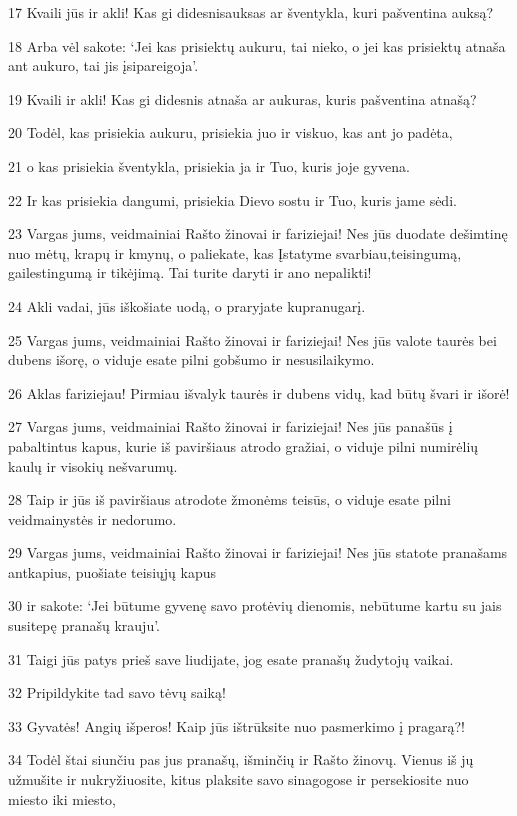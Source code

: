 \par 17 Kvaili jūs ir akli! Kas gi didesnis­auksas ar šventykla, kuri pašventina auksą? 
\par 18 Arba vėl sakote: ‘Jei kas prisiektų aukuru, tai nieko, o jei kas prisiektų atnaša ant aukuro, tai jis įsipareigoja’. 
\par 19 Kvaili ir akli! Kas gi didesnis­ atnaša ar aukuras, kuris pašventina atnašą? 
\par 20 Todėl, kas prisiekia aukuru, prisiekia juo ir viskuo, kas ant jo padėta, 
\par 21 o kas prisiekia šventykla, prisiekia ja ir Tuo, kuris joje gyvena. 
\par 22 Ir kas prisiekia dangumi, prisiekia Dievo sostu ir Tuo, kuris jame sėdi. 
\par 23 Vargas jums, veidmainiai Rašto žinovai ir fariziejai! Nes jūs duodate dešimtinę nuo mėtų, krapų ir kmynų, o paliekate, kas Įstatyme svarbiau,­teisingumą, gailestingumą ir tikėjimą. Tai turite daryti ir ano nepalikti! 
\par 24 Akli vadai, jūs iškošiate uodą, o praryjate kupranugarį. 
\par 25 Vargas jums, veidmainiai Rašto žinovai ir fariziejai! Nes jūs valote taurės bei dubens išorę, o viduje esate pilni gobšumo ir nesusilaikymo. 
\par 26 Aklas fariziejau! Pirmiau išvalyk taurės ir dubens vidų, kad būtų švari ir išorė! 
\par 27 Vargas jums, veidmainiai Rašto žinovai ir fariziejai! Nes jūs panašūs į pabaltintus kapus, kurie iš paviršiaus atrodo gražiai, o viduje pilni numirėlių kaulų ir visokių nešvarumų. 
\par 28 Taip ir jūs iš paviršiaus atrodote žmonėms teisūs, o viduje esate pilni veidmainystės ir nedorumo. 
\par 29 Vargas jums, veidmainiai Rašto žinovai ir fariziejai! Nes jūs statote pranašams antkapius, puošiate teisiųjų kapus 
\par 30 ir sakote: ‘Jei būtume gyvenę savo protėvių dienomis, nebūtume kartu su jais susitepę pranašų krauju’. 
\par 31 Taigi jūs patys prieš save liudijate, jog esate pranašų žudytojų vaikai. 
\par 32 Pripildykite tad savo tėvų saiką! 
\par 33 Gyvatės! Angių išperos! Kaip jūs ištrūksite nuo pasmerkimo į pragarą?! 
\par 34 Todėl štai siunčiu pas jus pranašų, išminčių ir Rašto žinovų. Vienus iš jų užmušite ir nukryžiuosite, kitus plaksite savo sinagogose ir persekiosite nuo miesto iki miesto, 
